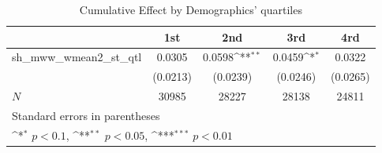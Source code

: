 \begin{table}[htbp]\centering
\def\sym#1{\ifmmode^{#1}\else\(^{#1}\)\fi}
\caption{Cumulative Effect by Demographics' quartiles}
\begin{tabular}{l*{4}{c}}
\hline\hline
            &\multicolumn{1}{c}{1st}&\multicolumn{1}{c}{2nd}&\multicolumn{1}{c}{3rd}&\multicolumn{1}{c}{4rd}\\
\hline
sh\_mww\_wmean2\_st\_qtl&      0.0305         &      0.0598\sym{**} &      0.0459\sym{*}  &      0.0322         \\
            &    (0.0213)         &    (0.0239)         &    (0.0246)         &    (0.0265)         \\
\hline
\(N\)       &       30985         &       28227         &       28138         &       24811         \\
\hline\hline
\multicolumn{5}{l}{\footnotesize Standard errors in parentheses}\\
\multicolumn{5}{l}{\footnotesize \sym{*} \(p<0.1\), \sym{**} \(p<0.05\), \sym{***} \(p<0.01\)}\\
\end{tabular}
\end{table}
